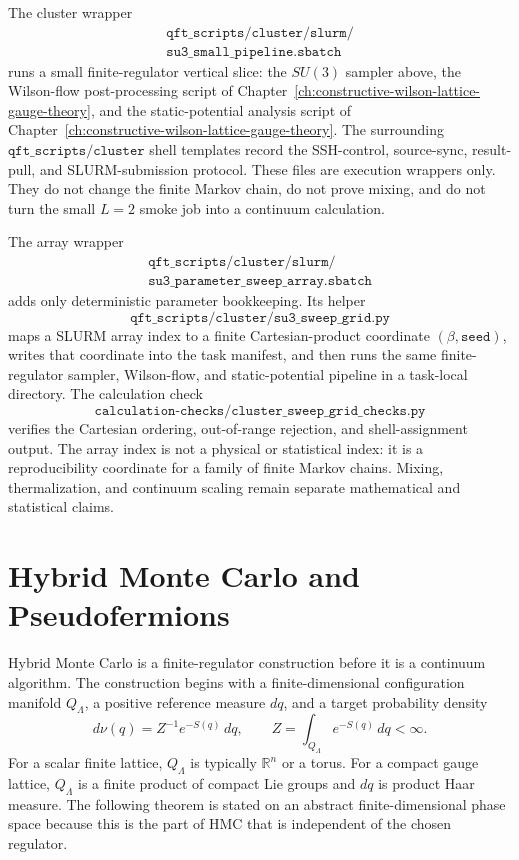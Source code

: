 The cluster wrapper
\[
  \begin{gathered}
  \texttt{qft\_scripts/cluster/slurm/}\\
  \texttt{su3\_small\_pipeline.sbatch}
  \end{gathered}
\]
runs a small finite-regulator vertical slice: the \(SU(3)\) sampler above,
the Wilson-flow post-processing script of
Chapter~\ref{ch:constructive-wilson-lattice-gauge-theory}, and the
static-potential analysis script of
Chapter~\ref{ch:constructive-wilson-lattice-gauge-theory}.  The surrounding
\(\texttt{qft\_scripts/cluster}\) shell templates record the SSH-control,
source-sync, result-pull, and SLURM-submission protocol.  These files are
execution wrappers only.  They do not change the finite Markov chain, do not
prove mixing, and do not turn the small \(L=2\) smoke job into a continuum
calculation.

The array wrapper
\[
  \begin{gathered}
  \texttt{qft\_scripts/cluster/slurm/}\\
  \texttt{su3\_parameter\_sweep\_array.sbatch}
  \end{gathered}
\]
adds only deterministic parameter bookkeeping.  Its helper
\[
  \texttt{qft\_scripts/cluster/su3\_sweep\_grid.py}
\]
maps a SLURM array index to a finite Cartesian-product coordinate
\((\beta,\texttt{seed})\), writes that coordinate into the task manifest, and
then runs the same finite-regulator sampler, Wilson-flow, and static-potential
pipeline in a task-local directory.  The calculation check
\[
  \texttt{calculation-checks/cluster\_sweep\_grid\_checks.py}
\]
verifies the Cartesian ordering, out-of-range rejection, and shell-assignment
output.  The array index is not a physical or statistical index: it is a
reproducibility coordinate for a family of finite Markov chains.  Mixing,
thermalization, and continuum scaling remain separate mathematical and
statistical claims.

\section{Hybrid Monte Carlo and Pseudofermions}
\label{sec:hmc-pseudofermions-finite-regulator}

Hybrid Monte Carlo is a finite-regulator construction before it is a
continuum algorithm.  The construction begins with a finite-dimensional
configuration manifold \(Q_\Lambda\), a positive reference measure \(dq\),
and a target probability density
\begin{equation}
  d\nu(q)
  =
  Z^{-1}e^{-S(q)}\,dq ,
  \qquad
  Z=\int_{Q_\Lambda}e^{-S(q)}\,dq<\infty .
  \label{eq:hmc-target-measure}
\end{equation}
For a scalar finite lattice, \(Q_\Lambda\) is typically \(\mathbb R^n\) or a
torus.  For a compact gauge lattice, \(Q_\Lambda\) is a finite product of
compact Lie groups and \(dq\) is product Haar measure.  The following theorem
is stated on an abstract finite-dimensional phase space because this is the
part of HMC that is independent of the chosen regulator.

